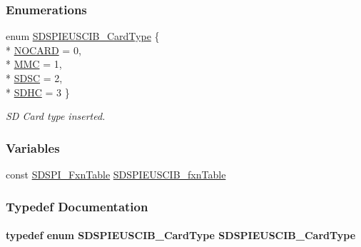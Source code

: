 \subsubsection*{Enumerations}
\begin{DoxyCompactItemize}
\item 
enum \hyperlink{_s_d_s_p_i_e_u_s_c_i_b_8h_a4fa2b3bc20d44e2e53e621d22a3d77a3}{S\+D\+S\+P\+I\+E\+U\+S\+C\+I\+B\+\_\+\+Card\+Type} \{ \\*
\hyperlink{_s_d_s_p_i_e_u_s_c_i_b_8h_a4fa2b3bc20d44e2e53e621d22a3d77a3a422cdc20ba86c8cdcf1f0fd2318a1cfc}{N\+O\+C\+A\+R\+D} = 0, 
\\*
\hyperlink{_s_d_s_p_i_e_u_s_c_i_b_8h_a4fa2b3bc20d44e2e53e621d22a3d77a3aa7d8fca3406f36682514f0384d910fac}{M\+M\+C} = 1, 
\\*
\hyperlink{_s_d_s_p_i_e_u_s_c_i_b_8h_a4fa2b3bc20d44e2e53e621d22a3d77a3a87550a2102744c14e5e2e0ed39cc04b2}{S\+D\+S\+C} = 2, 
\\*
\hyperlink{_s_d_s_p_i_e_u_s_c_i_b_8h_a4fa2b3bc20d44e2e53e621d22a3d77a3ab27db2a19a825c3e6f1513cdab7c81ea}{S\+D\+H\+C} = 3
 \}
\begin{DoxyCompactList}\small\item\em S\+D Card type inserted. \end{DoxyCompactList}\end{DoxyCompactItemize}
\subsubsection*{Variables}
\begin{DoxyCompactItemize}
\item 
const \hyperlink{struct_s_d_s_p_i___fxn_table}{S\+D\+S\+P\+I\+\_\+\+Fxn\+Table} \hyperlink{_s_d_s_p_i_e_u_s_c_i_b_8h_ae53304f30f9a424e2b374e421dbaa172}{S\+D\+S\+P\+I\+E\+U\+S\+C\+I\+B\+\_\+fxn\+Table}
\end{DoxyCompactItemize}


\subsubsection{Typedef Documentation}
\paragraph[{S\+D\+S\+P\+I\+E\+U\+S\+C\+I\+B\+\_\+\+Card\+Type}]{\setlength{\rightskip}{0pt plus 5cm}typedef enum {\bf S\+D\+S\+P\+I\+E\+U\+S\+C\+I\+B\+\_\+\+Card\+Type}  {\bf S\+D\+S\+P\+I\+E\+U\+S\+C\+I\+B\+\_\+\+Card\+Type}}\label{_s_d_s_p_i_e_u_s_c_i_b_8h_afa0443874109de3105ef57c073c64b87}


